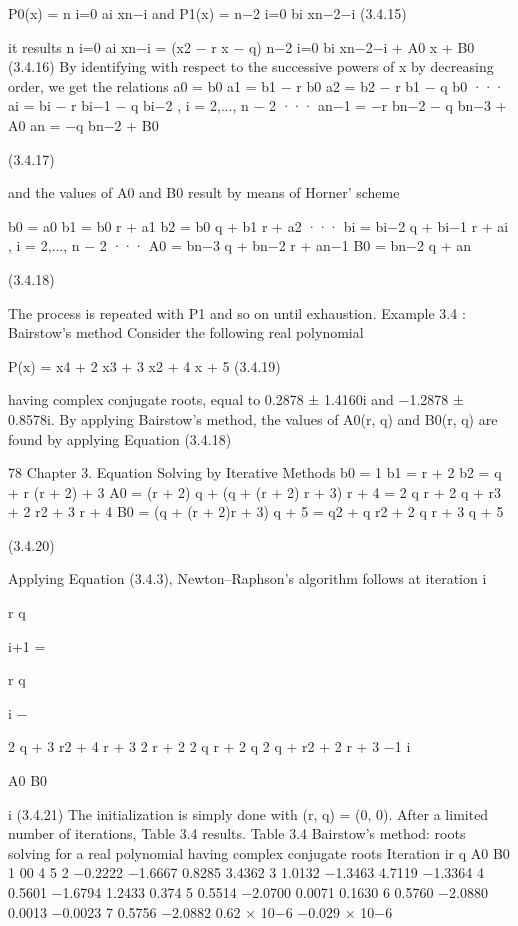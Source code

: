 \documentclass[letterpaper,12pt]{article}
\begin{document}
P0(x) =
n
i=0
ai xn−i and P1(x) =
n−2
i=0
bi xn−2−i (3.4.15)

it results
n
i=0
ai xn−i = (x2 − r x − q)
n−2
i=0
bi xn−2−i + A0 x + B0 (3.4.16)
By identifying with respect to the successive powers of x by decreasing order, we get
the relations a0 = b0
a1 = b1 − r b0
a2 = b2 − r b1 − q b0
···
ai = bi − r bi−1 − q bi−2 , i = 2,..., n − 2
···
an−1 = −r bn−2 − q bn−3 + A0
an = −q bn−2 + B0

(3.4.17)

and the values of A0 and B0 result by means of Horner’ scheme

b0 = a0
b1 = b0 r + a1
b2 = b0 q + b1 r + a2
···
bi = bi−2 q + bi−1 r + ai , i = 2,..., n − 2
···
A0 = bn−3 q + bn−2 r + an−1
B0 = bn−2 q + an

(3.4.18)

The process is repeated with P1 and so on until exhaustion.
Example 3.4 :
Bairstow’s method
Consider the following real polynomial

P(x) = x4 + 2 x3 + 3 x2 + 4 x + 5 (3.4.19)

having complex conjugate roots, equal to 0.2878 ± 1.4160i and −1.2878 ± 0.8578i.
By applying Bairstow’s method, the values of A0(r, q) and B0(r, q) are found by applying Equation
(3.4.18)

78 Chapter 3. Equation Solving by Iterative Methods
b0 = 1
b1 = r + 2
b2 = q + r (r + 2) + 3
A0 = (r + 2) q + (q + (r + 2) r + 3) r + 4 = 2 q r + 2 q + r3 + 2 r2 + 3 r + 4
B0 = (q + (r + 2)r + 3) q + 5 = q2 + q r2 + 2 q r + 3 q + 5

(3.4.20)

Applying Equation (3.4.3), Newton–Raphson’s algorithm follows at iteration i

r
q

i+1
=

r
q

i
−

2 q + 3 r2 + 4 r + 3 2 r + 2
2 q r + 2 q 2 q + r2 + 2 r + 3
−1
i

A0
B0

i
(3.4.21)
The initialization is simply done with (r, q) = (0, 0). After a limited number of iterations, Table 3.4
results.
Table 3.4 Bairstow’s method: roots solving for a real polynomial having complex conjugate roots
Iteration ir q A0 B0
1 00 4 5
2 −0.2222 −1.6667 0.8285 3.4362
3 1.0132 −1.3463 4.7119 −1.3364
4 0.5601 −1.6794 1.2433 0.374
5 0.5514 −2.0700 0.0071 0.1630
6 0.5760 −2.0880 0.0013 −0.0023
7 0.5756 −2.0882 0.62 × 10−6 −0.029 × 10−6
\end{document}

